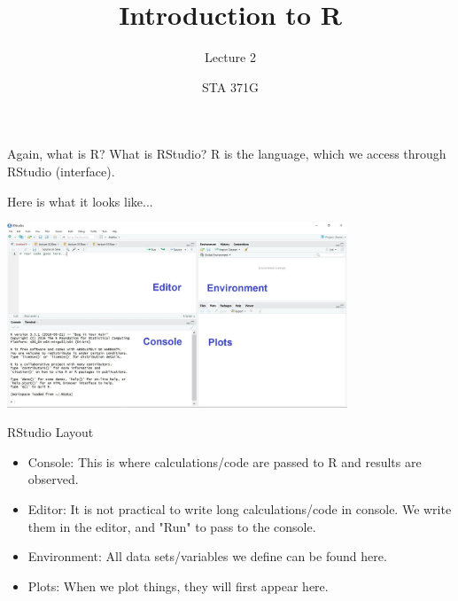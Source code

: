 \documentclass{beamer}\usepackage[]{graphicx}\usepackage[]{color}
\title{Introduction to R}
\subtitle{Lecture 2}
\author{STA 371G}
\begin{document}
  \frame{\maketitle}



  \begin{darkframes}
  
  
  
    \begin{frame}{Again, what is R? What is RStudio?}
    \fontsize{10}{10}\selectfont
     R is the language, which we access through RStudio (interface).\pause   
     
     \bigskip
     Here is what it looks like... 

      \begin{center}
        \includegraphics[width=4in]{RStudio}
      \end{center} \pause
    \end{frame}

    
    
    \begin{frame}{RStudio Layout}
    \fontsize{10}{10}\selectfont
      \begin{itemize}
        \item \alert{Console:} This is where calculations/code are passed to R and results are observed. \pause
        \item \alert{Editor:} It is not practical to write long calculations/code in console. We write them in the editor, and "Run" to pass to the console. \pause
        \item \alert{Environment:} All data sets/variables we define can be found here. \pause
        \item \alert{Plots:} When we plot things, they will first appear here.
      \end{itemize} 
    \end{frame}
    

\end{darkframes}
\end{document}
